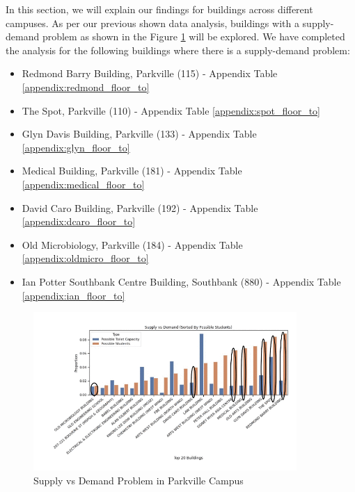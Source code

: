 In this section, we will explain our findings for buildings across different campuses. As per our previous shown data analysis, buildings with a supply-demand problem as shown in the Figure \ref{fig:floor_to} will be explored. We have completed the analysis for the following buildings where there is a supply-demand problem:
\begin{itemize}
    \item Redmond Barry Building, Parkville (115)  - Appendix Table \ref{appendix:redmond_floor_to}
    \item The Spot, Parkville (110) - Appendix Table \ref{appendix:spot_floor_to}
    \item Glyn Davis Building, Parkville (133) - Appendix Table \ref{appendix:glyn_floor_to}
    \item Medical Building, Parkville (181) - Appendix Table \ref{appendix:medical_floor_to}
    \item David Caro Building, Parkville (192) - Appendix Table \ref{appendix:dcaro_floor_to}
    \item Old Microbiology, Parkville (184) - Appendix Table \ref{appendix:oldmicro_floor_to}
    \item Ian Potter Southbank Centre Building, Southbank (880) - Appendix Table \ref{appendix:ian_floor_to}
\end{itemize}

\begin{figure}[H]
\centering
\includegraphics[width=10cm,keepaspectratio=true]{resources/images/floor_to/select_buildings.png}
\caption{Supply vs Demand Problem in Parkville Campus}
\label{fig:floor_to}
\end{figure}

